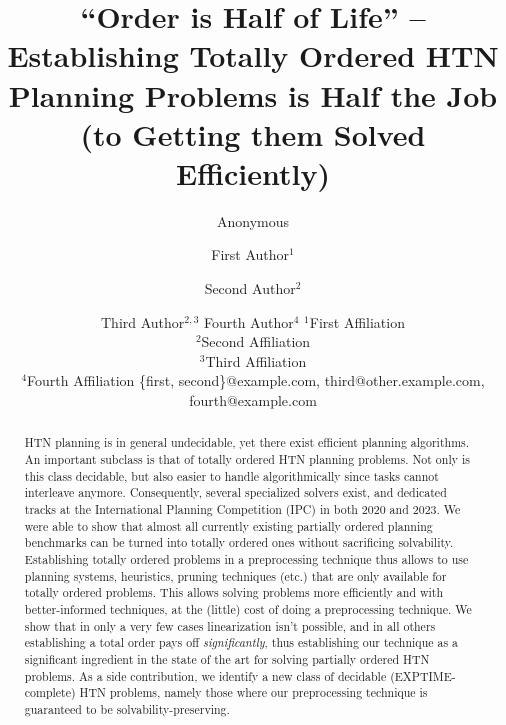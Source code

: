 \documentclass{article}
\title{``Order is Half of Life'' -- Establishing Totally Ordered HTN Planning Problems is Half the Job (to Getting them Solved Efficiently)}
\author{Anonymous}
\author{
First Author$^1$
\and
Second Author$^2$\and
Third Author$^{2,3}$\And
Fourth Author$^4$
\affiliations
$^1$First Affiliation\\
$^2$Second Affiliation\\
$^3$Third Affiliation\\
$^4$Fourth Affiliation
\emails
\{first, second\}@example.com,
third@other.example.com,
fourth@example.com
}
\begin{document}
\maketitle

\begin{abstract}
HTN planning is in general undecidable, yet there exist efficient planning algorithms. An important subclass is that of totally ordered HTN planning problems. Not only is this class decidable, but also easier to handle algorithmically since tasks cannot interleave anymore. Consequently, several specialized solvers exist, and dedicated tracks at the International Planning Competition (IPC) in both 2020 and 2023. We were able to show that almost all currently existing partially ordered planning benchmarks can be turned into totally ordered ones without sacrificing solvability. Establishing totally ordered problems in a preprocessing technique thus allows to use planning systems, heuristics, pruning techniques (etc.) that are only available for totally ordered problems. This allows solving problems more efficiently and with better-informed techniques, at the (little) cost of doing a preprocessing technique. We show that in only a very few cases linearization isn't possible, and in all others establishing a total order pays off \emph{significantly}, thus establishing our technique as a significant ingredient in the state of the art for solving partially ordered HTN problems. As a side contribution, we identify a new class of decidable (EXPTIME-complete) HTN problems, namely those where our preprocessing technique is guaranteed to be solvability-preserving.
\end{abstract}
















\end{document}
